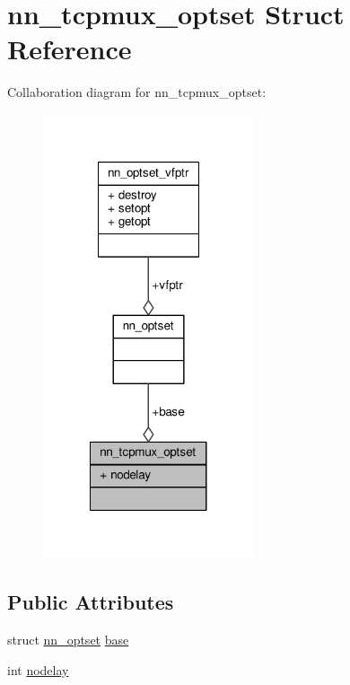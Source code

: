 \hypertarget{structnn__tcpmux__optset}{}\section{nn\+\_\+tcpmux\+\_\+optset Struct Reference}
\label{structnn__tcpmux__optset}


Collaboration diagram for nn\+\_\+tcpmux\+\_\+optset\+:\nopagebreak
\begin{figure}[H]
\begin{center}
\leavevmode
\includegraphics[width=176pt]{structnn__tcpmux__optset__coll__graph}
\end{center}
\end{figure}
\subsection*{Public Attributes}
\begin{DoxyCompactItemize}
\item 
struct \hyperlink{structnn__optset}{nn\+\_\+optset} \hyperlink{structnn__tcpmux__optset_a8c56761edc7976991ad1bb4ae6c44602}{base}
\item 
int \hyperlink{structnn__tcpmux__optset_a0c2c92a026e80f5c250aff379000fe12}{nodelay}
\end{DoxyCompactItemize}



